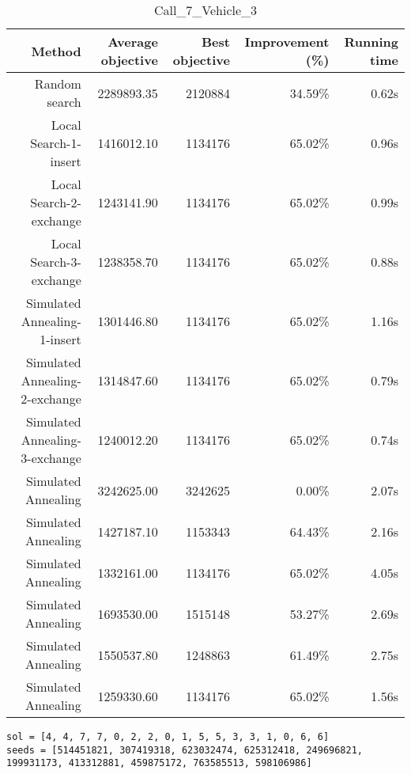 \begin{table}[ht]
\centering
\caption{Call\_7\_Vehicle\_3}
\label{tab:call7vehicle3}
\begin{tabular}{|r|r|r|r|r|}
Method & Average objective & Best objective & Improvement (\%) & Running time \\
\hline
Random search & 2289893.35 & 2120884 & 34.59\% & 0.62s\\
Local Search-1-insert & 1416012.10 & 1134176 & 65.02\% & 0.96s\\
Local Search-2-exchange & 1243141.90 & 1134176 & 65.02\% & 0.99s\\
Local Search-3-exchange & 1238358.70 & 1134176 & 65.02\% & 0.88s\\
Simulated Annealing-1-insert & 1301446.80 & 1134176 & 65.02\% & 1.16s\\
Simulated Annealing-2-exchange & 1314847.60 & 1134176 & 65.02\% & 0.79s\\
Simulated Annealing-3-exchange & 1240012.20 & 1134176 & 65.02\% & 0.74s\\
Simulated Annealing & 3242625.00 & 3242625 & 0.00\% & 2.07s\\
Simulated Annealing & 1427187.10 & 1153343 & 64.43\% & 2.16s\\
Simulated Annealing & 1332161.00 & 1134176 & 65.02\% & 4.05s\\
Simulated Annealing & 1693530.00 & 1515148 & 53.27\% & 2.69s\\
Simulated Annealing & 1550537.80 & 1248863 & 61.49\% & 2.75s\\
Simulated Annealing & 1259330.60 & 1134176 & 65.02\% & 1.56s\\
\end{tabular}%
\end{table}
\begin{lstlisting}[label={lst:call7vehicle3},caption=Optimal solution call\_7\_vehicle\_3]
sol = [4, 4, 7, 7, 0, 2, 2, 0, 1, 5, 5, 3, 3, 1, 0, 6, 6]
seeds = [514451821, 307419318, 623032474, 625312418, 249696821, 199931173, 413312881, 459875172, 763585513, 598106986]
\end{lstlisting}%
\clearpage


